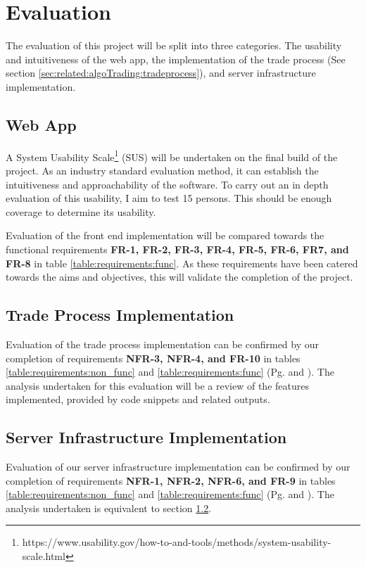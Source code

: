 %
\chapter{Evaluation}
\label{sec:evaluation}

The evaluation of this project will be split into three categories. The usability and intuitiveness of the web app, the implementation of the trade process (See section \ref{sec:related:algoTrading:tradeprocess}), and server infrastructure implementation.


\section{Web App}
\label{sec:evaluation:ui}
\noindent A System Usability Scale\footnote{https://www.usability.gov/how-to-and-tools/methods/system-usability-scale.html} (SUS) will be undertaken on the final build of the project. As an industry standard evaluation method, it can establish the intuitiveness and approachability of the software. To carry out an in depth evaluation of this usability, I aim to test 15 persons. This should be enough coverage to determine its usability.

Evaluation of the front end implementation will be compared towards the functional requirements \textbf{FR-1, FR-2, FR-3, FR-4, FR-5, FR-6, FR7, and FR-8} in table \ref{table:requirements:func}. As these requirements have been catered towards the aims and objectives, this will validate the completion of the project.


\section{Trade Process Implementation}
\label{sec:evaluation:tradeprocess}
\noindent Evaluation of the trade process implementation can be confirmed by our completion of requirements \textbf{NFR-3, NFR-4, and FR-10} in tables \ref{table:requirements:non_func} and \ref{table:requirements:func} (Pg. \pageref{table:requirements:non_func} and \pageref{table:requirements:func}). The analysis undertaken for this evaluation will be a review of the features implemented, provided by code snippets and related outputs.



\section{Server Infrastructure Implementation}
\label{sec:evaluation:simulteneous}
Evaluation of our server infrastructure implementation can be confirmed by our completion of requirements \textbf{NFR-1, NFR-2, NFR-6, and FR-9} in tables \ref{table:requirements:non_func} and \ref{table:requirements:func} (Pg. \pageref{table:requirements:non_func} and \pageref{table:requirements:func}). The analysis undertaken is equivalent to section \ref{sec:evaluation:tradeprocess}.